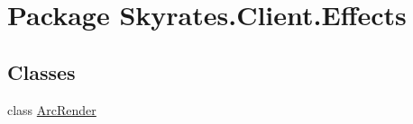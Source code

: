 \hypertarget{namespace_skyrates_1_1_client_1_1_effects}{\section{Package Skyrates.\-Client.\-Effects}
\label{namespace_skyrates_1_1_client_1_1_effects}
}
\subsection*{Classes}
\begin{DoxyCompactItemize}
\item 
class \hyperlink{class_skyrates_1_1_client_1_1_effects_1_1_arc_render}{Arc\-Render}
\end{DoxyCompactItemize}
